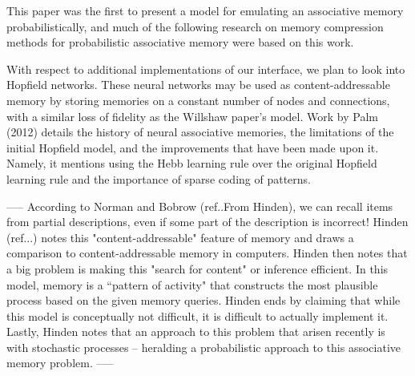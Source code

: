 \documentclass{sig-alternate}
\begin{document}
This paper was the first to present a model for emulating an associative memory
probabilistically, and much of the following research on memory compression methods
for probabilistic associative memory were based on this work.

With respect to additional implementations of our interface, we plan to look into 
Hopfield networks. These neural networks may be used as content-addressable memory by
storing memories on a constant number of nodes and connections, with a similar loss of 
fidelity as the Willshaw paper's model. Work by Palm (2012) details the history of 
neural associative memories, the limitations of the initial Hopfield model, and the improvements
that have been made upon it. Namely, it mentions using the Hebb learning rule over the original
Hopfield learning rule and the importance of sparse coding of patterns.


-----
According to Norman and Bobrow (ref..From Hinden), we can recall items from partial descriptions, 
even if some part of the description is incorrect!  Hinden (ref...) notes this "content-addressable" 
feature of memory and draws a comparison to content-addressable memory in computers. Hinden then notes 
that a big problem is making this "search for content" or inference efficient. In this model, memory is 
a ``pattern of activity" that constructs the most plausible process based on the given memory queries. 
Hinden ends by claiming that while this model is conceptually not difficult, it is difficult to actually 
implement it. Lastly, Hinden notes that an approach to this problem that arisen recently is with stochastic processes -- 
heralding a probabilistic approach to this associative memory problem. 
-----



~\cite{palm} %
~\cite{holographic} %
~\cite{distributed}%
~\cite{bobrow}
\end{document}
